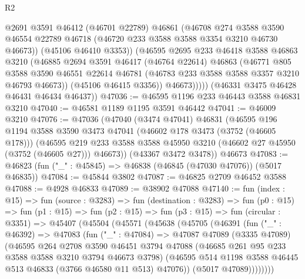 \begin{lexlean}{R2}
\begin{coremodule}
                @2691
                @3591
                @46412
                (@46701 @22789)
                @46861
                (@46708
                  @274
                  @3588
                  @3590
                  @46554
                  @22789
                  @46718
                  (@46720 @233 @3588 @3588 @3354 @3210 @46730 @46673))
                (@45106 @46410 @3353))
              (@46595
                @2695
                @233
                @46418
                @3588
                @46863
                @3210
                (@46885
                  @2694
                  @3591
                  @46417
                  (@46764 @22614)
                  @46863
                  (@46771
                    @805
                    @3588
                    @3590
                    @46551
                    @22614
                    @46781
                    (@46783 @233 @3588 @3588 @3357 @3210 @46793 @46673))
                  (@45106 @46415 @3356))
                @46673)))))
      (@46331 @3475 @46428 @46431 @46434 @46437))
@47036 := @46595 @1196 @233 @46443 @3588 @46831 @3210
@47040 := @46581 @1189 @1195 @3591 @46442
@47041 := @46009 @3210
@47076 := @47036
    (@47040
      (@3474 @47041)
      @46831
      (@46595
        @196
        @1194
        @3588
        @3590
        @3473
        @47041
        (@46602 @178 @3473 (@3752 (@46605 @178)))
        (@46595 @219 @233 @3588 @3588 @45950 @3210 (@46602 @27 @45950 (@3752 (@46605 @27))) @46673))
      (@43367 @3472 @3478))
    @46673
@47083 := @46823 (fun ("_" : @45845) => @46838 (@46845 (@47030 @47076)) (@5017 @46835))
@47084 := @45844 @3802
@47087 := @46825 @2709 @46452 @3588
@47088 := @4928 @46833
@47089 := @38902 @47088
@47140 := fun (index : @15) =>
  fun (source : @3283) =>
  fun (destination : @3283) =>
  fun (p0 : @15) =>
  fun (p1 : @15) =>
  fun (p2 : @15) =>
  fun (p3 : @15) =>
  fun (circular : @3351) =>
  @45407
    (@45504
      (@45571
        (@45638
          (@45705
            (@46391
              (fun ("_" : @46392) =>
              @47083
                (fun ("_" : @47084) =>
                @47087
                  @47089
                  (@3335 @47089)
                  (@46595
                    @264
                    @2708
                    @3590
                    @46451
                    @3794
                    @47088
                    (@46685 @261 @95 @233 @3588 @3588 @3210 @3794 @46673 @3798)
                    (@46595 @514 @1198 @3588 @46445 @513 @46833 (@3766 @46580 @11 @513) @47076))
                  (@5017 @47089))))))))

\end{coremodule}
\end{lexlean}

